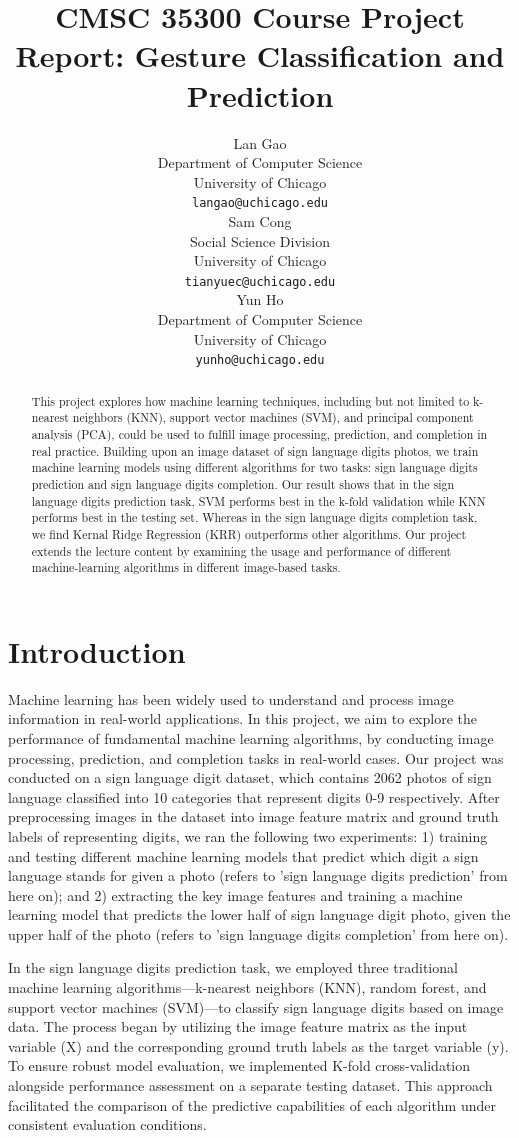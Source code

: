 \documentclass{article}
\title{CMSC 35300 Course Project Report: Gesture Classification and Prediction}
\author{
  Lan Gao \\
  Department of Computer Science \\
  University of Chicago \\
  \texttt{langao@uchicago.edu} \\
  \And
  Sam Cong \\
  Social Science Division \\
  University of Chicago \\
  \texttt{tianyuec@uchicago.edu} \\
  \And
  Yun Ho \\
  Department of Computer Science \\
  University of Chicago \\
  \texttt{yunho@uchicago.edu} \\
}
\begin{document}
\maketitle


\begin{abstract}
  This project explores how machine learning techniques, including but not limited to k-nearest neighbors (KNN), support vector machines (SVM), and principal component analysis (PCA), could be used to fulfill image processing, prediction, and completion in real practice. Building upon an image dataset of sign language digits photos, we train machine learning models using different algorithms for two tasks: sign language digits prediction and sign language digits completion. Our result shows that in the sign language digits prediction task, SVM performs best in the k-fold validation while KNN performs best in the testing set. Whereas in the sign language digits completion task, we find Kernal Ridge Regression (KRR) outperforms other algorithms. Our project extends the lecture content by examining the usage and performance of different machine-learning algorithms in different image-based tasks.
\end{abstract}


\section{Introduction}
Machine learning has been widely used to understand and process image information in real-world applications. In this project, we aim to explore the performance of fundamental machine learning algorithms, by conducting image processing, prediction, and completion tasks in real-world cases. Our project was conducted on a sign language digit dataset, which contains 2062 photos of sign language classified into 10 categories that represent digits 0-9 respectively. After preprocessing images in the dataset into image feature matrix and ground truth labels of representing digits, we ran the following two experiments: 1) training and testing different machine learning models that predict which digit a sign language stands for given a photo (refers to 'sign language digits prediction' from here on); and 2) extracting the key image features and training a machine learning model that predicts the lower half of sign language digit photo, given the upper half of the photo (refers to 'sign language digits completion' from here on).

In the sign language digits prediction task, we employed three traditional machine learning algorithms—k-nearest neighbors (KNN), random forest, and support vector machines (SVM)—to classify sign language digits based on image data. The process began by utilizing the image feature matrix as the input variable (X) and the corresponding ground truth labels as the target variable (y). To ensure robust model evaluation, we implemented K-fold cross-validation alongside performance assessment on a separate testing dataset. This approach facilitated the comparison of the predictive capabilities of each algorithm under consistent evaluation conditions.
\end{document}

